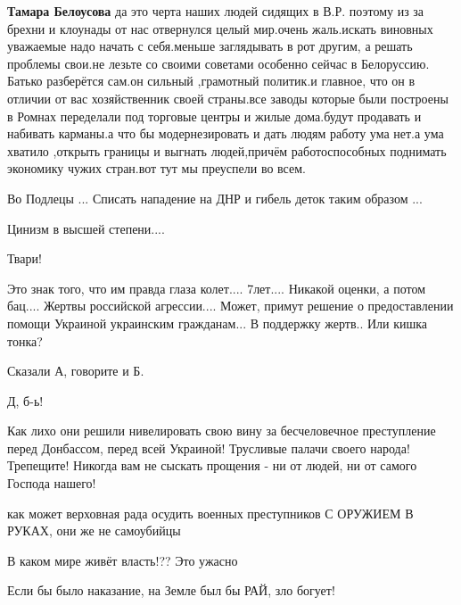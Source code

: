
\textbf{Тамара Белоусова} да это черта наших людей сидящих в В.Р. поэтому из за брехни и
клоунады от нас отвернулся целый мир.очень жаль.искать виновных уважаемые надо
начать с себя.меньше заглядывать в рот другим, а решать проблемы свои.не лезьте
со своими советами особенно сейчас в Белоруссию. Батько разберётся сам.он
сильный ,грамотный политик.и главное, что он в отличии от вас хозяйственник
своей страны.все заводы которые были построены в Ромнах переделали под торговые
центры и жилые дома.будут продавать и набивать карманы.а что бы модернезировать
и дать людям работу ума нет.а ума хватило ,открыть границы и выгнать
людей,причём работоспособных поднимать экономику чужих стран.вот тут мы
преуспели во всем.


Во Подлецы ... Списать нападение на ДНР и гибель деток таким образом ...


Цинизм в высшей степени....


Твари!


Это знак того, что им правда глаза колет.... 7лет.... Никакой оценки, а потом
бац.... Жертвы российской агрессии....  Может, примут решение о предоставлении
помощи Украиной украинским гражданам... В поддержку жертв..  Или кишка тонка?

Сказали А, говорите и Б.

Д, б-ь!


Как лихо они решили нивелировать свою вину за бесчеловечное преступление перед
Донбассом, перед всей Украиной! Трусливые палачи своего народа! Трепещите!
Никогда вам не сыскать прощения - ни от людей, ни от самого Господа нашего!


как может верховная рада осудить военных преступников С ОРУЖИЕМ В РУКАХ, они же не самоубийцы


В каком мире живёт власть!?? Это ужасно


Если бы было наказание, на Земле был бы РАЙ, зло богует!


